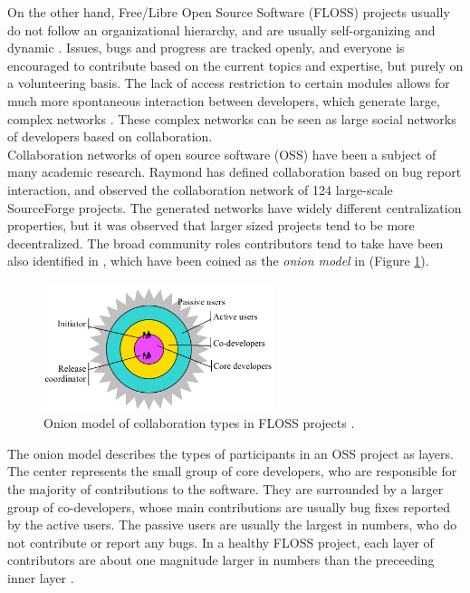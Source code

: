 On the other hand, Free/Libre Open Source Software (FLOSS) projects usually do not follow an organizational hierarchy, and are usually self-organizing and dynamic \cite{birdLatentSocialStructure2008}. Issues, bugs and progress are tracked openly, and everyone is encouraged to contribute based on the current topics and expertise, but purely on a volunteering basis. The lack of access restriction to certain modules allows for much more spontaneous interaction between developers, which generate large, complex networks \cite{martinez-romoUsingSocialNetwork2008}. These complex networks can be seen as large social networks of developers based on collaboration. \\

Collaboration networks of open source software (OSS) have been a subject of many academic research. Raymond \cite{crowstonSocialStructureFree2005} has defined collaboration based on bug report interaction, and observed the collaboration network of 124 large-scale SourceForge projects. The generated networks have widely different centralization properties, but it was observed that larger sized projects tend to be more decentralized. The broad community roles contributors tend to take have been also identified in \cite{crowstonSocialStructureFree2005}, which have been coined as the \textit{onion model} in \cite{martinez-romoUsingSocialNetwork2008} (Figure \ref{fig:onion1}). \\

\begin{figure}
    \centering
    \includegraphics[width=0.6\textwidth]{figures/onion_model.png}
    \caption{Onion model of collaboration types in FLOSS projects \cite{crowstonSocialStructureFree2005}.}
    \label{fig:onion1}
\end{figure}

The onion model describes the types of participants in an OSS project as layers. The center represents the small group of core developers, who are responsible for the majority of contributions to the software. They are surrounded by a larger group of co-developers, whose main contributions are usually bug fixes reported by the active users. The passive users are usually the largest in numbers, who do not contribute or report any bugs. In a healthy FLOSS project, each layer of contributors are about one magnitude larger in numbers than the preceeding inner layer \cite{mockusTwoCaseStudies2002}. \\

